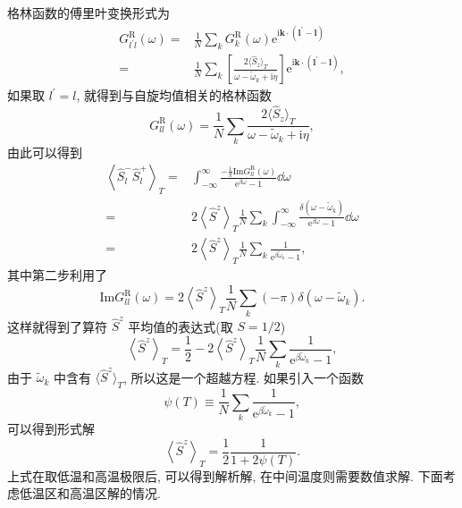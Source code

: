 格林函数的傅里叶变换形式为
 \begin{align}
        G_{l^\prime l }^{\mathrm{R}}(\omega)=&\frac{1}{N}\sum_k G_k^{\mathrm{R}}(\omega)\mathrm{e}^{\mathrm{i}\boldsymbol{k}\cdot (\boldsymbol{l}^\prime -\boldsymbol{l})}\nonumber\\
        =&\frac{1}{N}\sum_k\left[ \frac{2\langle \hat{S}_z \rangle_T}{\omega-\tilde{\omega}_k+\mathrm{i}\eta} \right] \mathrm{e}^{\mathrm{i}\boldsymbol{k}\cdot (\boldsymbol{l}^\prime-\boldsymbol{l})},
    \end{align}
如果取 $l^\prime=l$, 就得到与自旋均值相关的格林函数
\begin{equation}
    G_{ll}^{\mathrm{R}}(\omega)=\frac{1}{N}\sum_k\frac{2\langle \hat{S}_z \rangle_T}{\omega-\tilde{\omega}_k+\mathrm{i}\eta},
\end{equation}
由此可以得到
  \begin{align}
        \left\langle \hat{S}_l^-\hat{S}_l^+ \right\rangle_T=&\int_{-\infty}^\infty\frac{-\frac{1}{\pi}\mathrm{Im}G_{ll}^{\mathrm{R}}(\omega)}{\mathrm{e}^{\beta\omega}-1}\dd\omega\nonumber\\
        =&2\left\langle \hat{S}^z \right\rangle_T\frac{1}{N}\sum_k\int_{-\infty}^{\infty}\frac{\delta(\omega-\tilde{\omega}_k)}{\mathrm{e}^{\beta\omega}-1}\dd\omega\nonumber\\
        =&2\left\langle \hat{S}^z \right\rangle_T\frac{1}{N}\sum_k\frac{1}{\mathrm{e}^{\beta\tilde{\omega}_k}-1},
    \end{align}
其中第二步利用了
\begin{equation}
    \mathrm{Im}G_{ll}^{\mathrm{R}}(\omega)=2\left\langle \hat{S}^z \right\rangle_T\frac{1}{N}\sum_k(-\pi)\delta(\omega-\tilde{\omega}_k).
\end{equation}
这样就得到了算符 $\hat{S}^z$ 平均值的表达式(取 $S=1/2$)
\begin{equation}
    \left\langle \hat{S}^z \right\rangle_T=\frac{1}{2}-2\left\langle \hat{S}^z \right\rangle_T\frac{1}{N}\sum_{k}\frac{1}{\mathrm{e}^{\beta\tilde{\omega}_k}-1},
\end{equation}
由于 $\tilde{\omega}_k$ 中含有 $\langle \hat{S}^z \rangle_T$, 所以这是一个超越方程. 如果引入一个函数
\begin{equation}
    \psi(T)\equiv\frac{1}{N}\sum_k\frac{1}{\mathrm{e}^{\beta\tilde{\omega}_k}-1},
\end{equation}
可以得到形式解
\begin{equation}
    \left\langle \hat{S}^z \right\rangle_T=\frac{1}{2}\frac{1}{ 1+2\psi(T) }.
\end{equation}
上式在取低温和高温极限后, 可以得到解析解, 在中间温度则需要数值求解. 下面考虑低温区和高温区解的情况.

